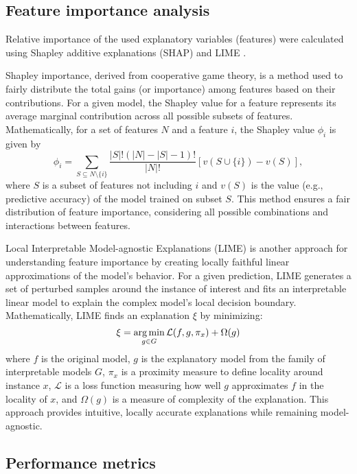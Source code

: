 \subsection{Feature importance analysis}

Relative importance of the used explanatory variables (features) were calculated using Shapley additive explanations (SHAP) \cite{Lundberg2017} and LIME \cite{Ribeiro2016}.

Shapley importance, derived from cooperative game theory, is a method used to fairly distribute the total gains (or importance) among features based on their contributions. For a given model, the Shapley value for a feature represents its average marginal contribution across all possible subsets of features. Mathematically, for a set of features \( N \) and a feature \( i \), the Shapley value \( \phi_i \) is given by 
\[ 
\phi_i = \sum_{S \subseteq N \setminus \{i\}} \frac{|S|! (|N| - |S| - 1)!}{|N|!} [v(S \cup \{i\}) - v(S)], 
\] 
where \( S \) is a subset of features not including \( i \) and \( v(S) \) is the value (e.g., predictive accuracy) of the model trained on subset \( S \). This method ensures a fair distribution of feature importance, considering all possible combinations and interactions between features.

Local Interpretable Model-agnostic Explanations (LIME) is another approach for understanding feature importance by creating locally faithful linear approximations of the model's behavior. For a given prediction, LIME generates a set of perturbed samples around the instance of interest and fits an interpretable linear model to explain the complex model's local decision boundary. Mathematically, LIME finds an explanation \( \xi \) by minimizing:
\[
\xi = \operatorname*{arg\,min}_{g \in G} \mathcal{L}(f, g, \pi_x) + \Omega(g)
\]
where \( f \) is the original model, \( g \) is the explanatory model from the family of interpretable models \( G \), \( \pi_x \) is a proximity measure to define locality around instance \( x \), \( \mathcal{L} \) is a loss function measuring how well \( g \) approximates \( f \) in the locality of \( x \), and \( \Omega(g) \) is a measure of complexity of the explanation. This approach provides intuitive, locally accurate explanations while remaining model-agnostic.




\subsection{Performance metrics}

